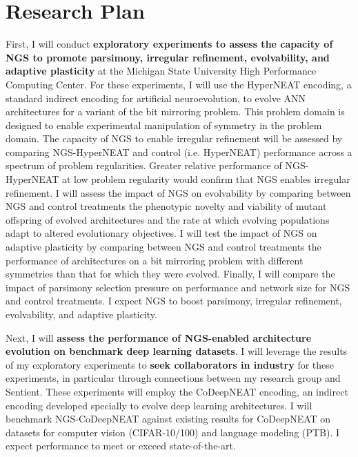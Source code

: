 \section{Research Plan}

First, I will conduct \textbf{exploratory experiments to assess the capacity of NGS to promote parsimony, irregular refinement, evolvability, and adaptive plasticity} at the Michigan State University High Performance Computing Center.
For these experiments, I will use the HyperNEAT encoding,\autocite{clune2011performance} a standard indirect encoding for artificial neuroevolution, to evolve ANN architectures for a variant of the bit mirroring problem.
This problem domain is designed to enable experimental manipulation of symmetry in the problem domain.
The capacity of NGS to enable irregular refinement will be assessed by comparing NGS-HyperNEAT and control (i.e. HyperNEAT) performance across a spectrum of problem regularities.
Greater relative performance of NGS-HyperNEAT at low problem regularity would confirm that NGS enables irregular refinement.
I will assess the impact of NGS on evolvability by comparing between NGS and control treatments the phenotypic novelty and viability of mutant offspring of evolved architectures and the rate at which evolving populations adapt to altered evolutionary objectives.\autocite{tarapore2015evolvability}
I will test the impact of NGS on adaptive plasticity by comparing between NGS and control treatments the performance of architectures on a bit mirroring problem with different symmetries than that for which they were evolved.
Finally, I will compare the impact of parsimony selection pressure on performance and network size for NGS and control treatments.
I expect NGS to boost parsimony, irregular refinement, evolvability, and adaptive plasticity.

Next, I will \textbf{assess the performance of NGS-enabled architecture evolution on benchmark deep learning datasets}.
I will leverage the results of my exploratory experiments to \textbf{seek collaborators in industry} for these experiments, in particular through connections between my research group and Sentient.
These experiments will employ the CoDeepNEAT encoding,\autocite{miikkulainen2017evolving} an indirect encoding developed specially to evolve deep learning architectures.
I will benchmark NGS-CoDeepNEAT against existing results for CoDeepNEAT on datasets for computer vision (CIFAR-10/100) and language modeling (PTB).
I expect performance to meet or exceed state-of-the-art.
